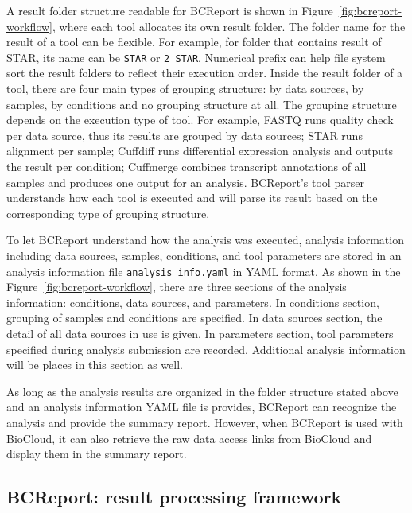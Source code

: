 A result folder structure readable for BCReport is shown in
Figure~\ref{fig:bcreport-workflow}, where each tool allocates its own result
folder. The folder name for the result of a tool can be flexible. For example,
for folder that contains result of STAR, its name can be \texttt{STAR} or
\texttt{2\_STAR}. Numerical prefix can help file system sort the result folders
to reflect their execution order. Inside the result folder of a tool, there are
four main types of grouping structure: by data sources, by samples, by
conditions and no grouping structure at all. The grouping structure depends on
the execution type of tool. For example, FASTQ runs quality check per data
source, thus its results are grouped by data sources; STAR runs alignment per
sample; Cuffdiff runs differential expression analysis and outputs the result
per condition; Cuffmerge combines transcript annotations of all samples and
produces one output for an analysis. BCReport's tool parser understands how
each tool is executed and will parse its result based on the corresponding type
of grouping structure.


To let BCReport understand how the analysis was executed, analysis information
including data sources, samples, conditions, and tool parameters are stored in
an analysis information file \texttt{analysis\_info.yaml} in YAML \cite{:yaml}
format. As shown in the Figure~\ref{fig:bcreport-workflow}, there are three
sections of the analysis information: conditions, data sources, and parameters.
In conditions section, grouping of samples and conditions are specified. In
data sources section, the detail of all data sources in use is given. In
parameters section, tool parameters specified during analysis submission are
recorded. Additional analysis information will be places in this section as
well.

As long as the analysis results are organized in the folder structure stated
above and an analysis information YAML file is provides, BCReport can recognize
the analysis and provide the summary report. However, when BCReport is used
with BioCloud, it can also retrieve the raw data access links from BioCloud and
display them in the summary report.



\subsection{BCReport: result processing framework}

